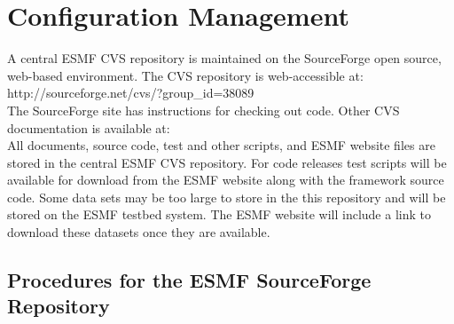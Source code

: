 
\section{Configuration Management}
\label{sec:cm}

A central ESMF CVS repository is maintained on the 
SourceForge open source, web-based environment.  The CVS repository is 
web-accessible at: \newline
{}
{http://sourceforge.net/cvs/?group_id=38089} \\

The SourceForge site has instructions for checking out code.  Other CVS
documentation is available at: \newline
{} \\

All documents, source code, test and other scripts, and ESMF website
files are stored in the central ESMF CVS repository.  For code releases 
test scripts will be available for download from the ESMF website along 
with the framework source code.  Some data sets may be too large to store 
in the this 
repository and will be stored on the ESMF testbed system.  The ESMF
website will include a link to download these datasets once they are
available.

\subsection{Procedures for the ESMF SourceForge Repository}

